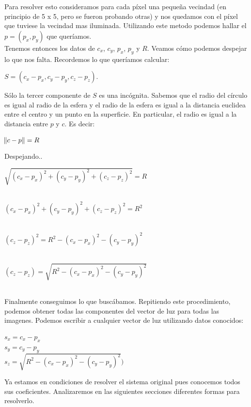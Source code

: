Para resolver esto consideramos para cada píxel una pequeña vecindad (en principio de 5 x 5, pero se fueron probando otras) y nos quedamos con el píxel que tuviese la vecindad mas iluminada. Utilizando este metodo podemos hallar el $p = (p_x, p_y)$ que queríamos. \\

Tenemos entonces los datos de $c_x$, $c_y$, $p_x$, $p_y$ y $R$. Veamos cómo podemos despejar lo que nos falta. Recordemos lo que queríamos calcular:
\begin{center}
    $S = (c_{x} - p_{x}, c_{y} - p_{y}, c_{z} - p_{z}).$
\end{center}

Sólo la tercer componente de $S$ es una incógnita. Sabemos que el radio del círculo es igual al radio de la esfera y el radio de la esfera es igual a la distancia euclidea entre el centro y un punto en la superficie. En particular, el radio es igual a la distancia entre $p$ y $c$. Es decir:

\begin{center}
    $\norm{c - p} = R$ \\
\end{center}

Despejando..

\begin{center}
    $\sqrt{(c_{x} - p_{x})^{2} + (c_{y} - p_{y})^{2} + (c_{z} - p_{z})^{2}} = R$ \\ $ $

    $(c_{x} - p_{x})^{2} + (c_{y} - p_{y})^{2} + (c_{z} - p_{z})^{2} = R^{2}$ \\ $ $

    $(c_{z} - p_{z})^{2} = R^{2} - (c_{x} - p_{x})^{2} - (c_{y} - p_{y})^{2}$ \\ $ $

    $(c_{z} - p_{z}) = \sqrt{R^{2} - (c_{x} - p_{x})^{2} - (c_{y} - p_{y})^{2}}$ \\ $ $

\end{center}

Finalmente conseguimos lo que buscábamos. Repitiendo este procedimiento, podemos obtener todas las componentes del vector de luz para todas las imagenes. Podemos escribir a cualquier vector de luz utilizando datos conocidos:

\begin{center}
    $s_x = c_{x} - p_{x}$ \\
    $s_y = c_{y} - p_{y}$ \\
    $s_z = \sqrt{R^{2} - (c_{x} - p_{x})^{2} - (c_{y} - p_{y})^{2}})$ \\
\end{center}

Ya estamos en condiciones de resolver el sistema original pues conocemos todos sus coeficientes. Analizaremos en las siguientes secciones diferentes formas para resolverlo.

